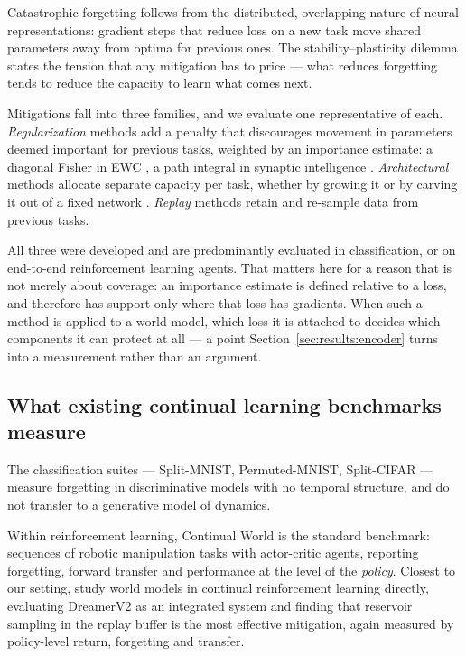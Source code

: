 Catastrophic forgetting \citep{mccloskey1989catastrophic, ratcliff1990connectionist,
french1999catastrophic} follows from the distributed, overlapping nature of
neural representations: gradient steps that reduce loss on a new task move
shared parameters away from optima for previous ones. The stability--plasticity
dilemma \citep{vandeven2024continual} states the tension that any mitigation has
to price --- what reduces forgetting tends to reduce the capacity to learn what
comes next.

Mitigations fall into three families, and we evaluate one representative of
each. \emph{Regularization} methods add a penalty that discourages movement in
parameters deemed important for previous tasks, weighted by an importance
estimate: a diagonal Fisher in EWC \citep{kirkpatrick2017ewc}, a path integral
in synaptic intelligence \citep{zenke2017si}. \emph{Architectural} methods
allocate separate capacity per task, whether by growing it
\citep{rusu2016progressive} or by carving it out of a fixed network
\citep{mallya2018packnet}. \emph{Replay} methods retain and re-sample data from
previous tasks.

All three were developed and are predominantly evaluated in classification, or
on end-to-end reinforcement learning agents. That matters here for a reason that
is not merely about coverage: an importance estimate is defined relative to a
loss, and therefore has support only where that loss has gradients. When such a
method is applied to a world model, which loss it is attached to decides which
components it can protect at all --- a point Section~\ref{sec:results:encoder}
turns into a measurement rather than an argument.

\subsection{What existing continual learning benchmarks measure}
\label{sec:related:benchmarks}

The classification suites --- Split-MNIST, Permuted-MNIST, Split-CIFAR --- measure
forgetting in discriminative models with no temporal structure, and do not
transfer to a generative model of dynamics.

Within reinforcement learning, Continual World
\citep{wolczyk2021continualworld} is the standard benchmark: sequences of
robotic manipulation tasks with actor-critic agents, reporting forgetting,
forward transfer and performance at the level of the \emph{policy}. Closest to
our setting, \citet{kessler2023effectiveness} study world models in continual
reinforcement learning directly, evaluating DreamerV2 as an integrated system
and finding that reservoir sampling in the replay buffer is the most effective
mitigation, again measured by policy-level return, forgetting and transfer.

